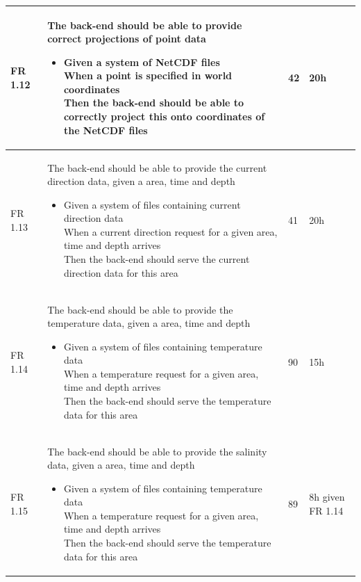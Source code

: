 \documentclass[11pt,a4paper,titlepage,oneside]{report}
\begin{document}
\begin{longtable}{p{1.4cm} p{7.8cm} p{1cm} p{1cm} }
  FR 1.12 & The back-end should be able to provide correct projections of point data
  \begin{itemize}
  \item \parbox[t]{6.8cm}{
        Given a system of NetCDF files \\
        When a point is specified in world coordinates \\
        Then the back-end should be able to correctly project this onto coordinates of the NetCDF files}
  \end{itemize}
  & 42 & 20h \\ \hline

  FR 1.13 & The back-end should be able to provide the current direction data, given a area, time and depth
  \begin{itemize}
  \item \parbox[t]{6.8cm}{
        Given a system of files containing current direction data \\
        When a current direction request for a given area, time and depth arrives \\
        Then the back-end should serve the current direction data for this area}
  \end{itemize}
  & 41 & 20h \\ \hline

  FR 1.14 & The back-end should be able to provide the temperature data, given a area, time and depth
  \begin{itemize}
  \item \parbox[t]{6.8cm}{
        Given a system of files containing temperature data \\
        When a temperature request for a given area, time and depth arrives \\
        Then the back-end should serve the temperature data for this area}
  \end{itemize}
  & 90 & 15h \\ \hline

  FR 1.15 & The back-end should be able to provide the salinity data, given a area, time and depth
  \begin{itemize}
  \item \parbox[t]{6.8cm}{
        Given a system of files containing temperature data \\
        When a temperature request for a given area, time and depth arrives \\
        Then the back-end should serve the temperature data for this area}
  \end{itemize}
  & 89 & 8h given FR 1.14 \\ \hline


\end{longtable}
\end{document}
